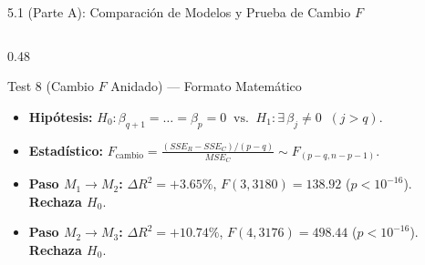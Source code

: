 \documentclass[aspectratio=169, 9pt]{beamer}
\begin{document}
\begin{frame}{5.1 (Parte A): Comparación de Modelos y Prueba de Cambio $F$}
\begin{columns}[T]
  \begin{column}{0.48\textwidth}
    \begin{exampleblock}{\footnotesize Test 8 (Cambio $F$ Anidado) — Formato Matemático}
      \scriptsize
      \begin{itemize}\setlength{\itemsep}{1pt}
        \item \textbf{Hipótesis:} $H_0: \beta_{q+1}=\dots=\beta_p=0 \;\;\text{vs.}\;\; H_1: \exists\,\beta_j \neq 0 \;\; (j > q)$.
        \item \textbf{Estadístico:} $F_{\text{cambio}} = \frac{(SSE_R - SSE_C)/(p-q)}{MSE_C} \sim F_{(p-q, n-p-1)}$.
        \item \textbf{Paso $M_1 \to M_2$:} $\Delta R^2 = +3.65\%$, $F(3, 3180) = \mathbf{138.92}$ ($p < 10^{-16}$). \textbf{Rechaza $H_0$}.
        \item \textbf{Paso $M_2 \to M_3$:} $\Delta R^2 = +10.74\%$, $F(4, 3176) = \mathbf{498.44}$ ($p < 10^{-16}$). \textbf{Rechaza $H_0$}.
      \end{itemize}
    \end{exampleblock}
  \end{column}
\end{columns}
\end{frame}
\end{document}

